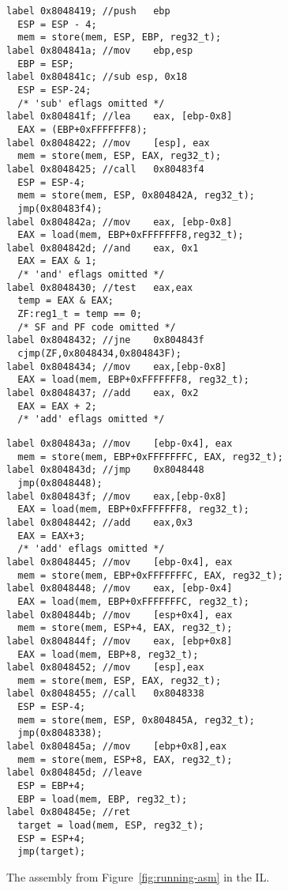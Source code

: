 \begin{figure}
\begin{scriptsize}
\begin{minipage}[c]{.50\linewidth}
\begin{lstlisting}
label 0x8048419; //push   ebp
  ESP = ESP - 4;
  mem = store(mem, ESP, EBP, reg32_t);
label 0x804841a; //mov    ebp,esp
  EBP = ESP;
label 0x804841c; //sub esp, 0x18
  ESP = ESP-24; 
  /* 'sub' eflags omitted */
label 0x804841f; //lea    eax, [ebp-0x8]
  EAX = (EBP+0xFFFFFFF8);
label 0x8048422; //mov    [esp], eax
  mem = store(mem, ESP, EAX, reg32_t);
label 0x8048425; //call   0x80483f4
  ESP = ESP-4;
  mem = store(mem, ESP, 0x804842A, reg32_t);
  jmp(0x80483f4); 
label 0x804842a; //mov    eax, [ebp-0x8]
  EAX = load(mem, EBP+0xFFFFFFF8,reg32_t);
label 0x804842d; //and    eax, 0x1
  EAX = EAX & 1; 
  /* 'and' eflags omitted */
label 0x8048430; //test   eax,eax
  temp = EAX & EAX;
  ZF:reg1_t = temp == 0; 
  /* SF and PF code omitted */
label 0x8048432; //jne    0x804843f
  cjmp(ZF,0x8048434,0x804843F);
label 0x8048434; //mov    eax,[ebp-0x8]
  EAX = load(mem, EBP+0xFFFFFFF8, reg32_t);
label 0x8048437; //add    eax, 0x2 
  EAX = EAX + 2; 
  /* 'add' eflags omitted */
\end{lstlisting}
\end{minipage}
\begin{minipage}[c]{.45\linewidth}
\begin{lstlisting}
label 0x804843a; //mov    [ebp-0x4], eax
  mem = store(mem, EBP+0xFFFFFFFC, EAX, reg32_t);
label 0x804843d; //jmp    0x8048448
  jmp(0x8048448);
label 0x804843f; //mov    eax,[ebp-0x8]
  EAX = load(mem, EBP+0xFFFFFFF8, reg32_t);
label 0x8048442; //add    eax,0x3
  EAX = EAX+3; 
  /* 'add' eflags omitted */
label 0x8048445; //mov    [ebp-0x4], eax
  mem = store(mem, EBP+0xFFFFFFFC, EAX, reg32_t);
label 0x8048448; //mov    eax, [ebp-0x4]
  EAX = load(mem, EBP+0xFFFFFFFC, reg32_t);
label 0x804844b; //mov    [esp+0x4], eax
  mem = store(mem, ESP+4, EAX, reg32_t);
label 0x804844f; //mov    eax, [ebp+0x8]
  EAX = load(mem, EBP+8, reg32_t);
label 0x8048452; //mov    [esp],eax
  mem = store(mem, ESP, EAX, reg32_t);
label 0x8048455; //call   0x8048338
  ESP = ESP-4;
  mem = store(mem, ESP, 0x804845A, reg32_t);
  jmp(0x8048338); 
label 0x804845a; //mov    [ebp+0x8],eax
  mem = store(mem, ESP+8, EAX, reg32_t);
label 0x804845d; //leave
  ESP = EBP+4;
  EBP = load(mem, EBP, reg32_t);
label 0x804845e; //ret
  target = load(mem, ESP, reg32_t);
  ESP = ESP+4;
  jmp(target);
\end{lstlisting}
\end{minipage}
\end{scriptsize}
\caption{The assembly from Figure~\ref{fig:running-asm} in the \bap IL.}
\label{fig:running-il}
\end{figure}